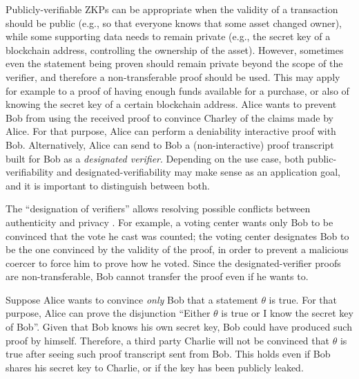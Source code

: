 	
	Publicly-verifiable ZKPs can be appropriate when the validity of a transaction should be public 
(e.g., so that everyone knows that some asset changed owner), while some supporting data needs to remain private 
(e.g., the secret key of a blockchain address, controlling the ownership of the asset).
	However, sometimes even the statement being proven should remain private beyond the scope of the verifier, and therefore a non-transferable proof	should be used.
	This may apply for example to a proof of having enough funds available for a purchase, or also of knowing the secret key of a certain blockchain address.
	Alice wants to prevent Bob from using the received proof to convince Charley of the claims made by Alice.
	For that purpose, Alice can perform a deniability interactive proof with Bob.
	Alternatively, Alice can send to Bob a (non-interactive) proof transcript built for Bob as a \emph{designated verifier}.
	Depending on the use case, both public-verifiability and designated-verifiability may make sense as an application goal, and it is important to distinguish between both.



	The ``designation of verifiers'' allows resolving possible conflicts between authenticity and privacy \cite{1996:eurocrypt:designated-verifier-proofs}.
	For example, a voting center wants only Bob to be convinced that the vote he cast was counted;
	the voting center designates Bob to be the one convinced by the validity of the proof, 
in order to prevent a malicious coercer to force him to prove how he voted.
	Since the designated-verifier proofs are non-transferable, Bob cannot transfer the proof even if he wants to.


	Suppose Alice wants to convince \emph{only} Bob that a statement $\theta$ is true.
	For that purpose, Alice can prove the disjunction ``Either $\theta$ is true or I know the secret key of Bob''.
	Given that Bob knows his own secret key, Bob could have produced such proof by himself.
	Therefore, a third party Charlie will not be convinced that $\theta$ is true after seeing such proof transcript sent from Bob.
	This holds even if Bob shares his secret key to Charlie, or if the key has been publicly leaked.

